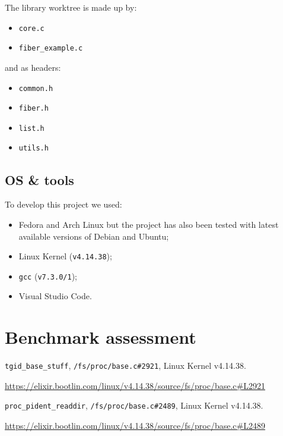 \documentclass[a4paper,10pt]{article}
\begin{document}
The library worktree is made up by:
\begin{itemize}
	\item \lstinline{core.c}
	\item \lstinline{fiber_example.c}
\end{itemize}
and as headers:
\begin{itemize}
	\item \lstinline{common.h}
	\item \lstinline{fiber.h}
	\item \lstinline{list.h}
	\item \lstinline{utils.h}
\end{itemize}


\subsection{OS \& tools}
To develop this project we used:
\begin{itemize}
	\item Fedora and Arch Linux but the project has also been tested with latest available versions of Debian and Ubuntu;
	\item Linux Kernel (\lstinline{v4.14.38});
	\item \lstinline{gcc} (\lstinline{v7.3.0/1});
	\item Visual Studio Code.
\end{itemize}

\section{Benchmark assessment}

\begin{thebibliography}{9}
  
  \lstinline{tgid_base_stuff}, \lstinline{/fs/proc/base.c#2921}, Linux Kernel v4.14.38.

  \url{https://elixir.bootlin.com/linux/v4.14.38/source/fs/proc/base.c#L2921}

  \lstinline{proc_pident_readdir}, \lstinline{/fs/proc/base.c#2489}, Linux Kernel v4.14.38.

  \url{https://elixir.bootlin.com/linux/v4.14.38/source/fs/proc/base.c#L2489}

\end{thebibliography}
\end{document}

